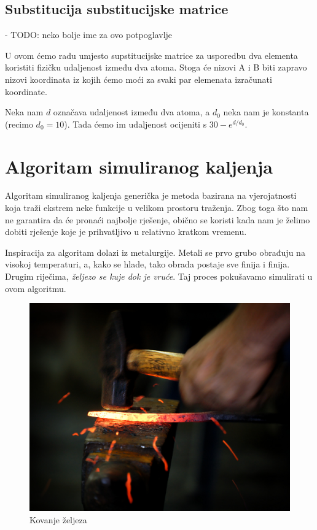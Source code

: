 \documentclass[times, utf8, zavrsni]{fer}
\begin{document}
\section{Substitucija substitucijske matrice}
- TODO: neko bolje ime za ovo potpoglavlje

U ovom ćemo radu umjesto supstitucijske matrice za usporedbu dva elementa
koristiti fizičku udaljenost između dva atoma. Stoga će nizovi A i B biti
zapravo nizovi koordinata iz kojih ćemo moći za svaki par elemenata
izračunati koordinate. 

Neka nam $d$ označava udaljenost između dva atoma, a $d_0$ neka nam
je konstanta (recimo $d_0 = 10$). Tada ćemo im udaljenost ocijeniti s
$30-e^{d/d_0}$. 


\chapter{Algoritam simuliranog kaljenja}
Algoritam simuliranog kaljenja generička je metoda bazirana na vjerojatnosti koja
traži ekstrem neke funkcije u velikom prostoru traženja. Zbog toga što nam ne
garantira da će pronaći najbolje rješenje, obično se koristi kada nam je
želimo dobiti rješenje koje je prihvatljivo u relativno kratkom
vremenu.

Inspiracija za algoritam dolazi iz metalurgije. Metali se prvo grubo obrađuju
na visokoj temperaturi, a, kako se hlade, tako obrada postaje sve finija
i  finija. Drugim riječima, \textit{željezo se kuje dok je vruće}. 
Taj proces pokušavamo simulirati u ovom algoritmu.

\begin{figure}[h]
\centering
\includegraphics{res/Kovanje_zeljeza_l.jpg}
\caption[Kovanje željeza]{Kovanje željeza}
\label{figure:kovanje}
\end{figure}
\end{document}
